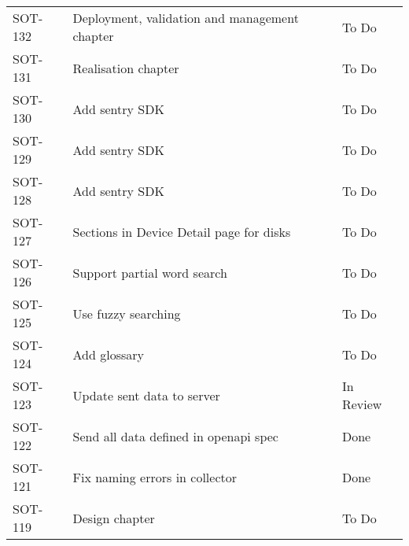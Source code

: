 \documentclass[dutch]{article}
\begin{document}
\begin{longtable}{@{}lp{6cm}l@{}}
    SOT-132            & Deployment, validation and management chapter                                                                             & To Do           \\
    SOT-131            & Realisation chapter                                                                                                       & To Do           \\
    SOT-130            & Add sentry SDK                                                                                                            & To Do           \\
    SOT-129            & Add sentry SDK                                                                                                            & To Do           \\
    SOT-128            & Add sentry SDK                                                                                                            & To Do           \\
    SOT-127            & Sections in Device Detail page for disks                                                                                  & To Do           \\
    SOT-126            & Support partial word search                                                                                               & To Do           \\
    SOT-125            & Use fuzzy searching                                                                                                       & To Do           \\
    SOT-124            & Add glossary                                                                                                              & To Do           \\
    SOT-123            & Update sent data to server                                                                                                & In Review       \\
    SOT-122            & Send all data defined in openapi spec                                                                                     & Done            \\
    SOT-121            & Fix naming errors in collector                                                                                            & Done            \\
    SOT-119            & Design chapter                                                                                                            & To Do           \\

\end{longtable}
\end{document}
